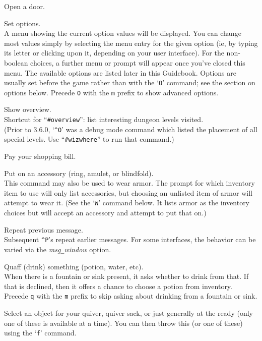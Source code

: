 Open a door.
\item[\tb{O}]
Set options.\\
A menu showing the current option values will be
displayed.  You can change most values simply by selecting the menu
entry for the given option (ie, by typing its letter or clicking upon
it, depending on your user interface).  For the non-boolean choices,
a further menu or prompt will appear once you've closed this menu.
The available options
are listed later in this Guidebook.  Options are usually set before the
game rather than with the `{\tt O}' command; see the section on options below.
Precede {\tt O} with the {\tt m} prefix to show advanced options.
\item[\tb{\^{}O}]
Show overview.\\
Shortcut for ``{\tt \#overview}'':
list interesting dungeon levels visited.\\
(Prior to 3.6.0, `{\tt \^{}O}' was a debug mode command which listed
the placement of all special levels.
Use ``{\tt \#wizwhere}'' to run that command.)
\item[\tb{p}]
Pay your shopping bill.
\item[\tb{P}]
Put on an accessory (ring, amulet, or blindfold).\\
This command may also be used to wear armor.  The prompt for
which inventory item to use will only list accessories, but choosing
an unlisted item of armor will attempt to wear it.
(See the `{\tt W}' command below.  It lists armor as the inventory
choices but will accept an accessory and attempt to put that on.)
\item[\tb{\^{}P}]
Repeat previous message.\\
Subsequent {\tt \^{}P}'s repeat earlier messages.
For some interfaces, the behavior can be varied via the
{\it msg\verb+_+window\/} option.
\item[\tb{q}]
Quaff (drink) something (potion, water, etc).\\
When there is a fountain or sink present, it asks whether to drink
from that.
If that is declined, then it offers a chance to choose a potion from
inventory.
Precede {\tt q} with the {\tt m} prefix to skip asking about
drinking from a fountain or sink.
\item[\tb{Q}]
Select an object for your quiver, quiver sack, or just generally at
the ready (only one of these is available at a time).  You can then throw
this (or one of these) using the `{\tt f}' command.
